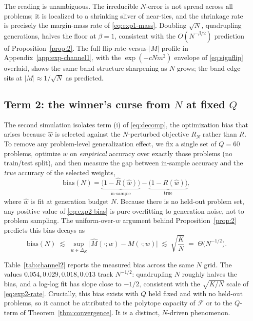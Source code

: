 \documentclass{article} %
\providecommand{\simplex}{\Delta_K}
\providecommand{\Risk}{R}
\providecommand{\eRisk}{\widehat{R}}
\providecommand{\Fcal}{\mathcal{F}}
\providecommand{\Mhat}{\widehat{M}}
\providecommand{\what}{\widehat{w}}
\begin{document}
The reading is unambiguous. The irreducible $N$-error is not spread across all
problems; it is localized to a shrinking sliver of near-ties, and the shrinkage
rate is precisely the margin-mass rate of \eqref{eq:exp1-mass}. Doubling
$\sqrt N$, quadrupling generations, halves the floor at $\beta=1$, consistent
with the $O(N^{-\beta/2})$ prediction of Proposition~\ref{prop:2}. The
full flip-rate-versus-$|M|$ profile in Appendix~\ref{app:exp-channel1}, with the
$\exp(-cNm^2)$ envelope of
\eqref{eq:signflip} overlaid, shows the same band structure sharpening as $N$
grows; the band edge sits at $|M|\approx 1/\sqrt N$ as predicted.

\subsection{Term 2: the winner's curse from $N$ at fixed $Q$}
\label{sec:exp-channel2}

The second simulation isolates term (i) of \eqref{eq:decomp}, the optimization
bias that arises because $\what$ is selected against the $N$-perturbed objective
$\Risk_N$ rather than $\Risk$. To remove any problem-level generalization effect,
we fix a single set of $Q=60$ problems, optimize $w$ on \emph{empirical} accuracy
over exactly those problems (no train/test split), and then measure the gap
between in-sample accuracy and the \emph{true} accuracy of the selected weights,
\begin{equation}
\label{eq:exp2-bias}
\mathrm{bias}(N)
= \underbrace{\big(1-\eRisk(\what)\big)}_{\text{in-sample}}
- \underbrace{\big(1-\Risk(\what)\big)}_{\text{true}},
\end{equation}
where $\what$ is fit at generation budget $N$. Because there is no held-out
problem set, any positive value of \eqref{eq:exp2-bias} is pure overfitting to
generation noise, not to problem sampling. The uniform-over-$w$ argument behind
Proposition~\ref{prop:2} predicts this bias decays as
\begin{equation}
\label{eq:exp2-rate}
\mathrm{bias}(N)
\;\lesssim\;
\sup_{w\in\simplex}\big|\Mhat(\cdot;w)-M(\cdot;w)\big|
\;\lesssim\;
\sqrt{\frac{K}{N}}
\;=\; \Theta\!\big(N^{-1/2}\big).
\end{equation}

Table~\ref{tab:channel2} reports the measured bias across the same $N$ grid. The
values $0.054, 0.029, 0.018, 0.013$ track $N^{-1/2}$: quadrupling $N$ roughly
halves the bias, and a log-log fit has slope close to $-1/2$, consistent with the
$\sqrt{K/N}$ scale of \eqref{eq:exp2-rate}. Crucially, this bias exists with $Q$
held fixed and with no held-out problems, so it cannot be attributed to the
polytope capacity of $\Fcal$ or to the $Q$-term of Theorem~\ref{thm:convergence}. It is
a distinct, $N$-driven phenomenon.
\end{document}
